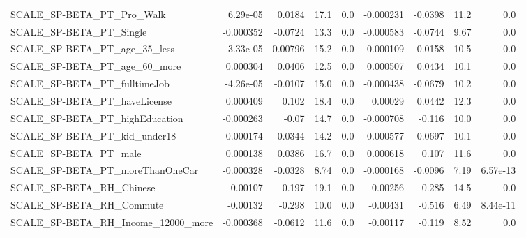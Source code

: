 \begin{tabular}{lrrrrrrrr}
SCALE\_SP-BETA\_PT\_Pro\_Walk                          &    6.29e-05 &       0.0184 &      17.1 &      0.0 &  -0.000231 &     -0.0398 &         11.2 &           0.0 \\
SCALE\_SP-BETA\_PT\_Single                            &   -0.000352 &      -0.0724 &      13.3 &      0.0 &  -0.000583 &     -0.0744 &         9.67 &           0.0 \\
SCALE\_SP-BETA\_PT\_age\_35\_less                       &    3.33e-05 &      0.00796 &      15.2 &      0.0 &  -0.000109 &     -0.0158 &         10.5 &           0.0 \\
SCALE\_SP-BETA\_PT\_age\_60\_more                       &    0.000304 &       0.0406 &      12.5 &      0.0 &   0.000507 &      0.0434 &         10.1 &           0.0 \\
SCALE\_SP-BETA\_PT\_fulltimeJob                       &   -4.26e-05 &      -0.0107 &      15.0 &      0.0 &  -0.000438 &     -0.0679 &         10.2 &           0.0 \\
SCALE\_SP-BETA\_PT\_haveLicense                       &    0.000409 &        0.102 &      18.4 &      0.0 &    0.00029 &      0.0442 &         12.3 &           0.0 \\
SCALE\_SP-BETA\_PT\_highEducation                     &   -0.000263 &        -0.07 &      14.7 &      0.0 &  -0.000708 &      -0.116 &         10.0 &           0.0 \\
SCALE\_SP-BETA\_PT\_kid\_under18                       &   -0.000174 &      -0.0344 &      14.2 &      0.0 &  -0.000577 &     -0.0697 &         10.1 &           0.0 \\
SCALE\_SP-BETA\_PT\_male                              &    0.000138 &       0.0386 &      16.7 &      0.0 &   0.000618 &       0.107 &         11.6 &           0.0 \\
SCALE\_SP-BETA\_PT\_moreThanOneCar                    &   -0.000328 &      -0.0328 &      8.74 &      0.0 &  -0.000168 &     -0.0096 &         7.19 &      6.57e-13 \\
SCALE\_SP-BETA\_RH\_Chinese                           &     0.00107 &        0.197 &      19.1 &      0.0 &    0.00256 &       0.285 &         14.5 &           0.0 \\
SCALE\_SP-BETA\_RH\_Commute                           &    -0.00132 &       -0.298 &      10.0 &      0.0 &   -0.00431 &      -0.516 &         6.49 &      8.44e-11 \\
SCALE\_SP-BETA\_RH\_Income\_12000\_more                 &   -0.000368 &      -0.0612 &      11.6 &      0.0 &   -0.00117 &      -0.119 &         8.52 &           0.0 \\

\end{tabular}

